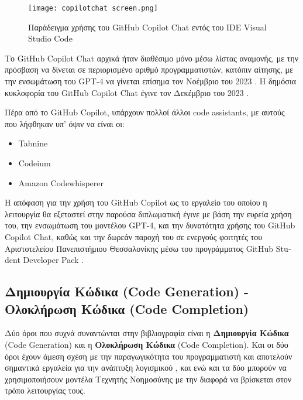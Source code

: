 \begin{figure}[H]
  \begin{center}
    \texttt{[image: copilotchat screen.png]}
    \label{fig:cpchat}
    \caption{Παράδειγμα χρήσης του \textlatin{GitHub Copilot Chat} εντός
      του \textlatin{IDE} \textlatin{Visual Studio Code}
    \cite{vscodeintro, vscode} }
  \end{center}
\end{figure}

Το \textlatin{GitHub Copilot Chat} αρχικά ήταν διαθέσιμο μόνο μέσω
λίστας αναμονής, με την πρόσβαση να δίνεται σε περιορισμένο αριθμό
προγραμματιστών, κατόπιν αίτησης, με την ενσωμάτωση του
\textlatin{GPT-4} να γίνεται επίσημα τον Νοέμβριο του 2023
\cite{github2023gpt4}. Η δημόσια κυκλοφορία του \textlatin{GitHub
Copilot Chat} έγινε τον Δεκέμβριο του 2023 \cite{github2023chat}.

Πέρα από το \textlatin{GitHub Copilot}, υπάρχουν πολλοί άλλοι
\textlatin{code assistants}, με αυτούς που λήφθηκαν υπ' όψιν να είναι
οι:
\begin{itemize}
  \item
    \textlatin{Tabnine} \cite{microsoft2021tabnine, vincent2019ai}
  \item
    \textlatin{Codeium} \cite{forbes2024codeium}
  \item
    \textlatin{Amazon Codewhisperer} \cite{bays2022AWS}
\end{itemize}
Η απόφαση για την χρήση του \textlatin{GitHub Copilot} ως το εργαλείο 
του οποίου η λειτουργία θα εξεταστεί στην παρούσα διπλωματική έγινε με
βάση την ευρεία χρήση του, την ενσωμάτωση του μοντέλου
\textlatin{GPT-4}, και την δυνατότητα χρήσης του \textlatin{GitHub
Copilot Chat}, καθώς και την δωρεάν παροχή του σε ενεργούς φοιτητές
του Αριστοτελείου Πανεπιστήμιου Θεσσαλονίκης μέσω του προγράμματος
\textlatin{GitHub Student Developer Pack} \cite{githubstudentpack}.

\subsection{Δημιουργία Κώδικα \textlatin{(Code Generation)} - Ολοκλήρωση
Κώδικα \textlatin{(Code Completion)} }

\label{sec:ch1-}

Δύο όροι που συχνά συναντώνται στην βιβλιογραφία είναι η
\textbf{Δημιουργία Κώδικα} \textlatin{(Code Generation)} και η
\textbf{Ολοκλήρωση Κώδικα} \textlatin{(Code Completion)}. Και οι δύο
όροι έχουν άμεση σχέση με την παραγωγικότητα του προγραμματιστή και
αποτελούν σημαντικά εργαλεία για την ανάπτυξη λογισμικού \cite{codecomp,
koester1996effect, asaduzzaman2014cscc}, και ενώ και τα δύο μπορούν να
χρησιμοποιήσουν μοντέλα Τεχνητής Νοημοσύνης
\cite{svyatkovskoy2020fast,raychev2014code} με την διαφορά να βρίσκεται
στον τρόπο λειτουργίας τους.

